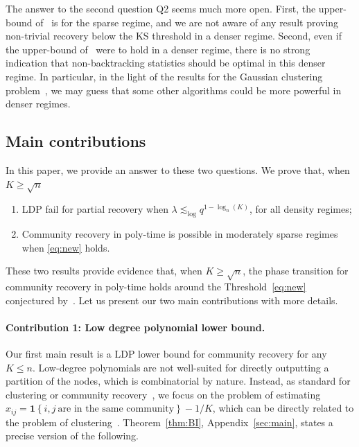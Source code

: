 \documentclass[final]{colt2026}
\newcommand{\1}{\mathbf{1}}
\newcommand{\ac}[1]{\left\{#1\right\}}
\begin{document}
The answer to the second question Q2 seems much more open. First, the upper-bound of~\cite{pmlr-v291-chin25a} is for the sparse regime, and we are not aware of any result proving non-trivial recovery below the KS threshold in a denser regime. Second, even if the upper-bound of~\cite{pmlr-v291-chin25a} were to hold in a denser regime, there is no strong indication that non-backtracking statistics should be optimal in this denser regime. In particular, in the light of the results for the Gaussian clustering problem~\cite{Even24}, we may guess that some other algorithms could be more powerful in  denser regimes.\medskip

\subsection{Main contributions}
In this paper, we provide an answer to these two questions. We prove that, when $K\geq \sqrt{n}$
\begin{enumerate}[wide, labelindent=0pt]
\setlength{\itemsep}{0pt}
\item LDP fail for partial recovery when $\lambda \lesssim_{\log} q^{1-\log_{n}(K)}$, for all density regimes;
\item Community recovery in poly-time is possible in  moderately sparse regimes when  \eqref{eq:new} holds.
\end{enumerate}
These two results provide evidence that, when $K\geq \sqrt{n}$, the phase transition for community recovery in poly-time holds around the Threshold~\eqref{eq:new} conjectured by~\cite{pmlr-v291-chin25a}.
Let us present our two main contributions with more details.

\paragraph{Contribution 1: Low degree polynomial lower bound.}
Our first main result is a LDP lower bound for community recovery for any $K\leq n$. Low-degree polynomials are not well-suited for directly outputting a partition of the nodes, which is combinatorial by nature. Instead, as standard for clustering or community recovery~\cite{luo2023computational,Even24,SohnWein25,pmlr-v291-chin25a,Even25a}, we focus on the problem of estimating $x_{ij}=\mathbf{1}\ac{i,j\ \text{are in the same community}}-1/K$, which can be directly related to the problem of clustering~\cite{Even24,Even25a}. Theorem~\ref{thm:BI},
Appendix~\ref{sec:main}, states a precise version of the following.
\end{document}
